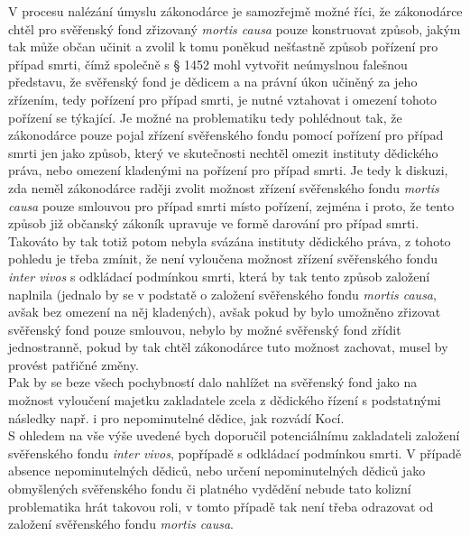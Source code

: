 \documentclass{article}
\begin{document}
V procesu nalézání úmyslu zákonodárce je samozřejmě možné říci, že zákonodárce chtěl pro svěřenský fond zřizovaný \textit{mortis causa} pouze konstruovat způsob, jakým tak může občan učinit a zvolil k tomu poněkud nešťastně způsob pořízení pro případ smrti, čímž společně s § 1452 mohl vytvořit neúmyslnou falešnou představu, že svěřenský fond je dědicem a na právní úkon učiněný za jeho zřízením, tedy pořízení pro případ smrti, je nutné vztahovat i omezení tohoto pořízení se týkající. Je možné na problematiku tedy pohlédnout tak, že zákonodárce pouze pojal zřízení svěřenského fondu pomocí pořízení pro případ smrti jen jako způsob, který ve skutečnosti nechtěl omezit instituty dědického práva, nebo omezení kladenými na pořízení pro případ smrti. Je tedy k diskuzi, zda neměl zákonodárce raději zvolit možnost zřízení svěřenského fondu \textit{mortis causa} pouze smlouvou pro případ smrti místo pořízení, zejména i proto, že tento způsob již občanský zákoník upravuje ve formě darování pro případ smrti. Takováto by tak totiž potom nebyla svázána instituty dědického práva, z tohoto pohledu je třeba zmínit, že není vyloučena možnost zřízení svěřenského fondu \textit{inter vivos} s odkládací podmínkou smrti, která by tak tento způsob založení naplnila (jednalo by se v podstatě o založení svěřenského fondu \textit{mortis causa}, avšak bez omezení na něj kladených), avšak pokud by bylo umožněno zřizovat svěřenský fond pouze smlouvou, nebylo by možné svěřenský fond zřídit jednostranně, pokud by tak chtěl zákonodárce tuto možnost zachovat, musel by provést patřičné změny.\\

Pak by se beze všech pochybností dalo nahlížet na svěřenský fond jako na možnost vyloučení majetku zakladatele zcela z dědického řízení s podstatnými následky např. i pro nepominutelné dědice, jak rozvádí Kocí.\\

S ohledem na vše výše uvedené bych doporučil potenciálnímu zakladateli založení svěřenského fondu \textit{inter vivos}, popřípadě s odkládací podmínkou smrti. V případě absence nepominutelných dědiců, nebo určení nepominutelných dědiců jako obmyšlených svěřenského fondu či platného vydědění nebude tato kolizní problematika hrát takovou roli, v tomto případě tak není třeba odrazovat od založení svěřenského fondu \textit{mortis causa}.\\
\end{document}
